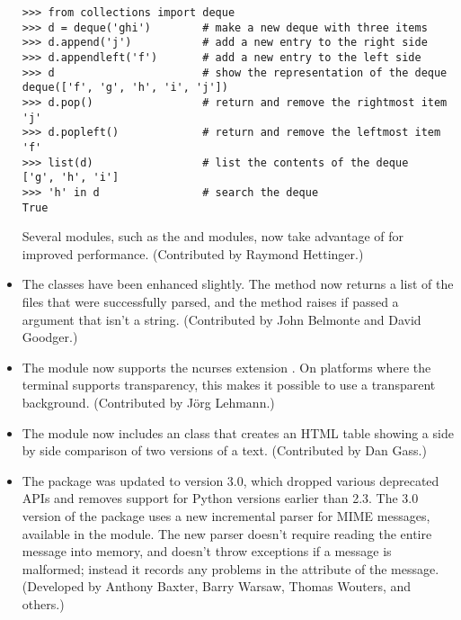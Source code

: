 \documentclass{howto}
\begin{document}
\begin{itemize}
\begin{verbatim}
>>> from collections import deque
>>> d = deque('ghi')        # make a new deque with three items
>>> d.append('j')           # add a new entry to the right side
>>> d.appendleft('f')       # add a new entry to the left side
>>> d                       # show the representation of the deque
deque(['f', 'g', 'h', 'i', 'j'])
>>> d.pop()                 # return and remove the rightmost item
'j'
>>> d.popleft()             # return and remove the leftmost item
'f'
>>> list(d)                 # list the contents of the deque
['g', 'h', 'i']
>>> 'h' in d                # search the deque
True  
\end{verbatim}

Several modules, such as the  and 
modules, now take advantage of  for improved
performance.  (Contributed by Raymond Hettinger.)

\item The  classes have been enhanced slightly.
   The  method now returns a list of the files that
   were successfully parsed, and the  method raises
    if passed a  argument that isn't a
   string.   (Contributed by John Belmonte and David Goodger.)

\item The  module now supports the ncurses extension 
   .  On platforms where the terminal
   supports transparency, this makes it possible to use a transparent
   background.  (Contributed by J\"org Lehmann.)

\item The  module now includes an  class
that creates an HTML table showing a side by side comparison
of two versions of a text.   (Contributed by Dan Gass.)

\item The  package was updated to version 3.0, 
which dropped various deprecated APIs and removes support for Python
versions earlier than 2.3.  The 3.0 version of the package uses a new
incremental parser for MIME messages, available in the
 module.  The new parser doesn't require
reading the entire message into memory, and doesn't throw exceptions
if a message is malformed; instead it records any problems in the 
 attribute of the message.  (Developed by Anthony
Baxter, Barry Warsaw, Thomas Wouters, and others.)


\end{itemize}
\end{document}
